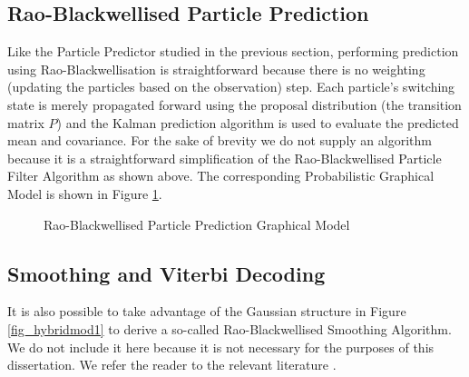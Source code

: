 \subsection{Rao-Blackwellised Particle Prediction}
Like the Particle Predictor studied in the previous section, performing prediction using Rao-Blackwellisation is straightforward because there is no weighting (updating the particles based on the observation) step. Each particle's switching state is merely propagated forward using the proposal distribution (the transition matrix $P$) and the Kalman prediction algorithm is used to evaluate the predicted mean and covariance. For the sake of brevity we do not supply an algorithm because it is a straightforward simplification of the Rao-Blackwellised Particle Filter Algorithm as shown above. The corresponding Probabilistic Graphical Model is shown in Figure \ref{fig_hybridmod1_prediction}.
\begin{figure}[H] 
\centering
{}
\caption{Rao-Blackwellised Particle Prediction Graphical Model}
\label{fig_hybridmod1_prediction}
\end{figure}

\subsection{Smoothing and Viterbi Decoding}
It is also possible to take advantage of the Gaussian structure in Figure \ref{fig_hybridmod1} to derive a so-called Rao-Blackwellised Smoothing Algorithm. We do not include it here because it is not necessary for the purposes of this dissertation. We refer the reader to the relevant literature \cite{chen}\cite{doucet}. 

